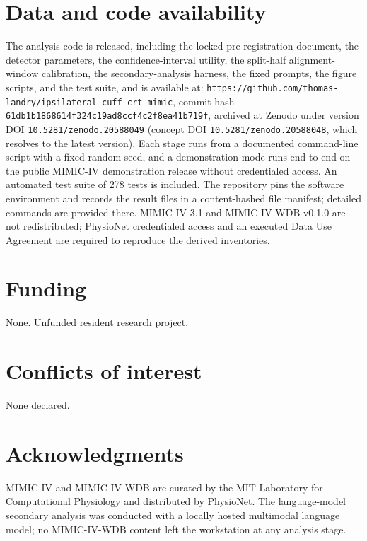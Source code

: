 \documentclass[twocolumn,letterpaper,10pt]{article}
\begin{document}
\section*{Data and code availability}

The analysis code is released, including the locked pre-registration document, the detector parameters, the confidence-interval utility, the split-half alignment-window calibration, the secondary-analysis harness, the fixed prompts, the figure scripts, and the test suite, and is available at: \texttt{https://github.com/thomas-landry/ipsilateral-cuff-crt-mimic}, commit hash \texttt{61db1b1868614f324c19ad8ccf4c2f8ea41b719f}, archived at Zenodo under version DOI \texttt{10.5281/zenodo.20588049} (concept DOI \texttt{10.5281/zenodo.20588048}, which resolves to the latest version). Each stage runs from a documented command-line script with a fixed random seed, and a demonstration mode runs end-to-end on the public MIMIC-IV demonstration release without credentialed access. An automated test suite of 278 tests is included. The repository pins the software environment and records the result files in a content-hashed file manifest; detailed commands are provided there. MIMIC-IV-3.1\cite{johnson2023_mimic4} and MIMIC-IV-WDB v0.1.0\cite{moody2022_wdb} are not redistributed; PhysioNet credentialed access and an executed Data Use Agreement are required to reproduce the derived inventories.

\section*{Funding}

None. Unfunded resident research project.

\section*{Conflicts of interest}

None declared.

\section*{Acknowledgments}

MIMIC-IV and MIMIC-IV-WDB are curated by the MIT Laboratory for Computational Physiology and distributed by PhysioNet. The language-model secondary analysis was conducted with a locally hosted multimodal language model; no MIMIC-IV-WDB content left the workstation at any analysis stage.
\end{document}
